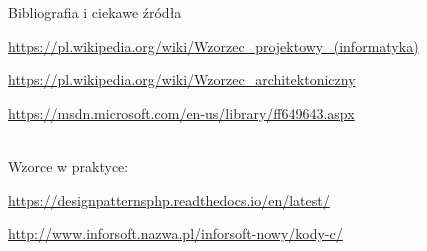 \begin{frame}{Bibliografia i ciekawe źródła}
  
	\begin{thebibliography}{9}
	
		\url{https://pl.wikipedia.org/wiki/Wzorzec_projektowy_(informatyka)}
	
		\url{https://pl.wikipedia.org/wiki/Wzorzec_architektoniczny}
	
		\url{https://msdn.microsoft.com/en-us/library/ff649643.aspx}
		
		\ \\ Wzorce w praktyce:
	
		\url{https://designpatternsphp.readthedocs.io/en/latest/}
	
		\url{http://www.inforsoft.nazwa.pl/inforsoft-nowy/kody-c/}
		
	\end{thebibliography}

\end{frame}

